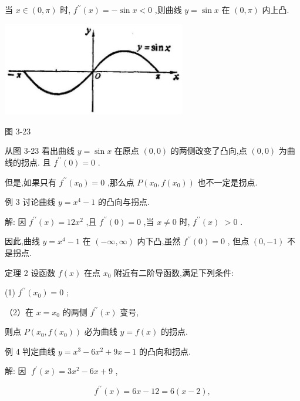 \documentclass[10pt]{article}
\begin{document}
当 \(x \in \left( {0,\pi }\right)\) 时, \({f}^{\prime \prime }\left( x\right) = - \sin x < 0\) ,则曲线 \(y = \sin x\) 在 \(\left( {0,\pi }\right)\) 内上凸.

\begin{center}
\includegraphics[max width=0.6\textwidth]{images/01912c18-5c3f-733d-b775-749ba9897a9d_169_891522.jpg}
\end{center}

图 3-23

从图 3-23 看出曲线 \(y = \sin x\) 在原点 \(\left( {0,0}\right)\) 的两侧改变了凸向,点 \(\left( {0,0}\right)\) 为曲线的拐点. 且 \({f}^{\prime \prime }\left( 0\right) = 0\) .

但是,如果只有 \({f}^{\prime \prime }\left( {x}_{0}\right) = 0\) ,那么点 \(P\left( {{x}_{0},f\left( {x}_{0}\right) }\right)\) 也不一定是拐点.

例 3 讨论曲线 \(y = {x}^{4} - 1\) 的凸向与拐点.

解: 因 \({f}^{\prime \prime }\left( x\right) = {12}{x}^{2}\) ,且 \({f}^{\prime \prime }\left( 0\right) = 0\) ,当 \(x \neq 0\) 时, \({f}^{\prime \prime }\left( x\right)\) \(> 0\) .

因此,曲线 \(y = {x}^{4} - 1\) 在 \(\left( {-\infty ,\infty }\right)\) 内下凸,虽然 \({f}^{\prime \prime }\left( 0\right) = 0\) , 但点 \(\left( {0, - 1}\right)\) 不是拐点.

定理 2 设函数 \(f\left( x\right)\) 在点 \({x}_{0}\) 附近有二阶导函数,满足下列条件:

(1) \({f}^{\prime \prime }\left( {x}_{0}\right) = 0\) ;

（2）在 \(x = {x}_{0}\) 的两侧 \({f}^{\prime \prime }\left( x\right)\) 变号,

则点 \(P\left( {{x}_{0},f\left( {x}_{0}\right) }\right)\) 必为曲线 \(y = f\left( x\right)\) 的拐点.

例 4 判定曲线 \(y = {x}^{3} - 6{x}^{2} + {9x} - 1\) 的凸向和拐点.

解: 因 \(\;{f}^{\prime }\left( x\right) = 3{x}^{2} - {6x} + 9\) ,

\[
{f}^{\prime \prime }\left( x\right) = {6x} - {12} = 6\left( {x - 2}\right) ,
\]
\end{document}
